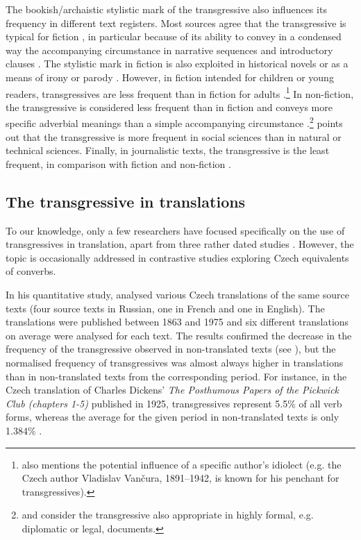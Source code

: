 \documentclass[output=paper,russian]{langsci/langscibook}
\begin{document}
The bookish\slash archaistic stylistic mark of the transgressive also influences its frequency in different text registers. Most sources agree that the transgressive is typical for fiction \parencites[105]{dvorak83}[24]{becka77}[102]{cecetal97}, in particular because of its ability to convey in a condensed way the accompanying circumstance in narrative sequences and introductory clauses \parencites[107]{dvorak83}[19 and example \ref{olga:ex1}]{becka77}. The stylistic mark in fiction is also exploited in historical novels or as a means of irony or parody \parencites[102--103]{cecetal97}[154]{komarek86}. However, in fiction intended for children or young readers, transgressives are less frequent than in fiction for adults \parencite[see][90]{jeletal61}.\footnote{\textcite[23]{becka77} also mentions the potential influence of a specific author’s idiolect (e.g. the Czech author Vladislav Vančura, 1891–1942, is known for his penchant for transgressives).} In non-fiction, the transgressive is considered less frequent than in fiction and conveys more specific adverbial meanings than a simple accompanying circumstance \parencites[see][33]{dvorak83}[21]{becka77}[337]{karetal95}.\footnote{\textcite{karlik17} and \textcite{cecetal97} consider the transgressive also appropriate in highly formal, e.g. diplomatic or legal, documents.} \textcite[106 and 108]{dvorak83} points out that the transgressive is more frequent in social sciences than in natural or technical sciences. Finally, in journalistic texts, the transgressive is the least frequent, in comparison with fiction and non-fiction \parencites[106]{dvorak83}[90]{jeletal61}.

\subsection{The transgressive in translations}\label{olga:trt}

To our knowledge, only a few researchers have focused specifically on the use of transgressives in translation, apart from three rather dated studies \parencites{becka77}{dvorak72}{dvorak83}. However, the topic is occasionally addressed in contrastive studies exploring Czech equivalents of converbs.

In his quantitative study, \textcites{dvorak72}{dvorak83} analysed various Czech translations of the same source texts (four source texts in Russian, one in French and one in English). The translations were published between 1863 and 1975 and six different translations on average were analysed for each text. The results confirmed the decrease in the frequency of the transgressive observed in non-translated texts (see ), but the normalised frequency of transgressives was almost always higher in translations than in non-translated texts from the corresponding period. For instance, in the Czech translation of Charles Dickens' \textit{The Posthumous Papers of the Pickwick Club (chapters 1-5)} published in 1925, transgressives represent 5.5\% of all verb forms, whereas the average for the given period in non-translated texts is only 1.384\% \parencite[94]{dvorak83}.
\end{document}
